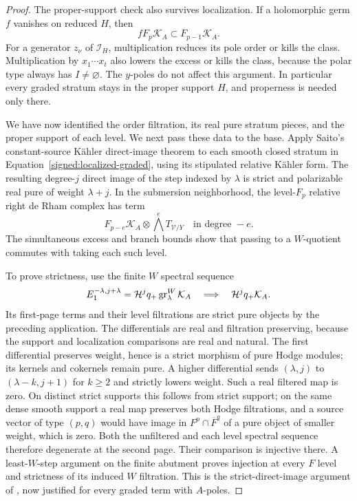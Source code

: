\begin{proof}
The proper-support check also survives localization.  If a
holomorphic germ \(f\) vanishes on reduced \(H\), then
\begin{equation}\label{signed:support-condition}
 fF_p\mathcal K_A\subset F_{p-1}\mathcal K_A.
\end{equation}
For a generator \(z_\nu\) of \(\mathscr I_H\), multiplication
reduces its pole order or kills the class.  Multiplication by
\(x_1\cdots x_t\) also lowers the excess or kills the class,
because the polar type always has \(I\ne\varnothing\).
The \(y\)-poles do not affect this argument.  In particular
every graded stratum stays in the proper support \(H\), and
properness is needed only there.

We have now identified the order filtration, its real pure stratum pieces,
and the proper support of each level.  We next pass these data to the base.
Apply Saito's constant-source Kähler direct-image theorem
\cite[Theorem~1 and Remark~1.2]{SaitoKahler} to each smooth
closed stratum in Equation~\eqref{signed:localized-graded},
using its stipulated relative Kähler form.  The resulting
degree-\(j\) direct image of the step indexed by \(\lambda\)
is strict and polarizable real pure of weight \(\lambda+j\).
In the submersion neighborhood, the level-\(F_p\) relative
right de Rham complex has term
\[
 F_{p-e}\mathcal K_A\otimes\bigwedge^e T_{\mathscr V/Y}
 \quad\text{in degree }-e.
\]
The simultaneous excess and branch bounds show that passing
to a \(W\)-quotient commutes with taking each such level.

To prove strictness, use the finite \(W\) spectral sequence
\[
 E_1^{-\lambda,j+\lambda}
   =\mathcal H^j q_+\operatorname{gr}^W_\lambda\mathcal K_A
 \quad\Longrightarrow\quad \mathcal H^j q_+\mathcal K_A.
\]
Its first-page terms and their level filtrations are strict
pure objects by the preceding application.  The differentials
are real and filtration preserving, because the support and
localization comparisons are real and natural.  The first
differential preserves weight, hence is a strict morphism of
pure Hodge modules; its kernels and cokernels remain pure.
A higher differential sends \((\lambda,j)\) to
\((\lambda-k,j+1)\) for \(k\geq2\) and strictly lowers
weight.  Such a real filtered map is zero.  On distinct strict
supports this follows from strict support; on the same dense
smooth support a real map preserves both Hodge filtrations,
and a source vector of type \((p,q)\) would have image in
\(F^p\cap\overline F^q\) of a pure object of smaller weight,
which is zero.  Both the unfiltered and each level spectral
sequence therefore degenerate at the second page.  Their
comparison is injective there.  A least-\(W\)-step argument
on the finite abutment proves injection at every \(F\) level
and strictness of its induced \(W\) filtration.  This is the
strict-direct-image argument of \cite[Proposition~11.1]{BL},
now justified for every graded term with \(A\)-poles.


\end{proof}
